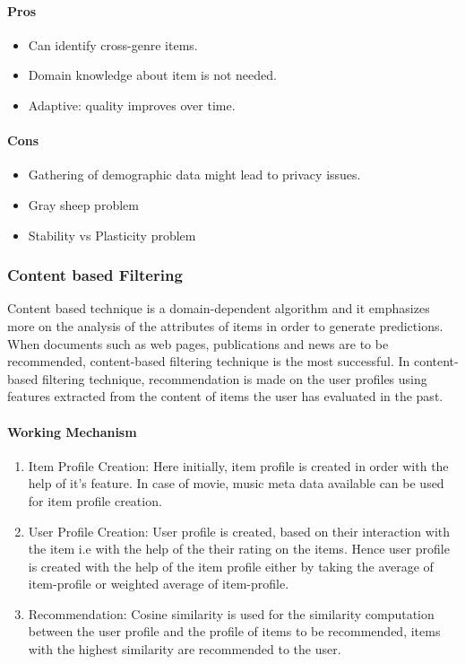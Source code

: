 \paragraph{Pros}\hfill
\begin{itemize}
	\item Can identify cross-genre items.
	\item Domain knowledge about item is not needed.
	\item Adaptive: quality improves over time.
\end{itemize}
\paragraph{Cons}\hfill
\begin{itemize}
	\item Gathering of demographic data might lead to privacy issues.
	\item Gray sheep problem
	\item Stability vs Plasticity problem
	
\end{itemize}
\subsubsection{Content based Filtering}
Content based technique \cite{recommend} is a domain-dependent algorithm and it emphasizes more on the analysis of the attributes of items in order to generate predictions. When documents such as web pages, publications and news are to be recommended, content-based filtering technique is the most successful. In content-based filtering technique, recommendation is made on the user profiles using features extracted from the content of items the user has evaluated in the past. 
\paragraph{Working Mechanism}\hfill

\begin{enumerate}
	\item Item Profile Creation: Here initially, item profile is created in order with the help of it's feature. In case of movie, music meta data available can be used for item profile creation.
	\item User Profile Creation: User profile is created, based on their interaction with the item i.e with the help of the their rating on the items. Hence user profile is created with the help of the item profile either by taking the average of item-profile or weighted average of item-profile.
	\item Recommendation: Cosine similarity is used for the similarity computation between the user profile and the profile of items to be recommended, items with the highest similarity are recommended to the user. 
\end{enumerate}

